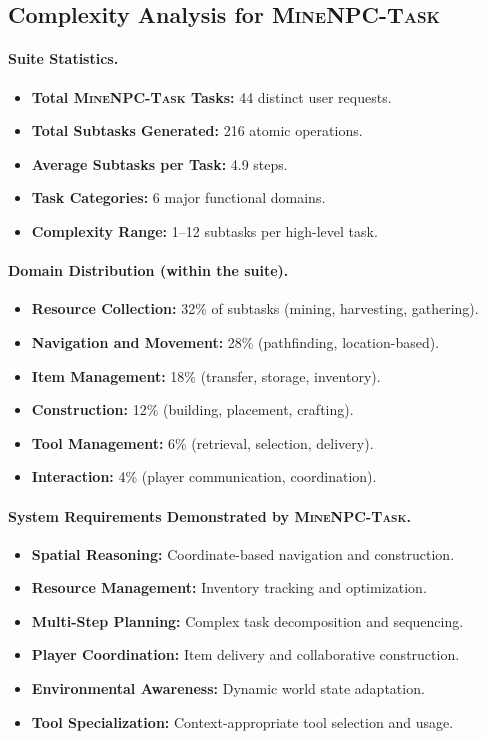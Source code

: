 \appxsep
\subsection{Complexity Analysis for \textsc{MineNPC-Task}}

\paragraph{Suite Statistics.}
\begin{itemize}
  \item \textbf{Total \textsc{MineNPC-Task} Tasks:} 44 distinct user requests.
  \item \textbf{Total Subtasks Generated:} 216 atomic operations.
  \item \textbf{Average Subtasks per Task:} 4.9 steps.
  \item \textbf{Task Categories:} 6 major functional domains.
  \item \textbf{Complexity Range:} 1--12 subtasks per high-level task.
\end{itemize}

\appxsmallsep
\paragraph{Domain Distribution (within the suite).}
\begin{itemize}
  \item \textbf{Resource Collection:} 32\% of subtasks (mining, harvesting, gathering).
  \item \textbf{Navigation and Movement:} 28\% (pathfinding, location-based).
  \item \textbf{Item Management:} 18\% (transfer, storage, inventory).
  \item \textbf{Construction:} 12\% (building, placement, crafting).
  \item \textbf{Tool Management:} 6\% (retrieval, selection, delivery).
  \item \textbf{Interaction:} 4\% (player communication, coordination).
\end{itemize}

\appxsmallsep
\paragraph{System Requirements Demonstrated by \textsc{MineNPC-Task}.}
\begin{itemize}
  \item \textbf{Spatial Reasoning:} Coordinate-based navigation and construction.
  \item \textbf{Resource Management:} Inventory tracking and optimization.
  \item \textbf{Multi-Step Planning:} Complex task decomposition and sequencing.
  \item \textbf{Player Coordination:} Item delivery and collaborative construction.
  \item \textbf{Environmental Awareness:} Dynamic world state adaptation.
  \item \textbf{Tool Specialization:} Context-appropriate tool selection and usage.
\end{itemize}

